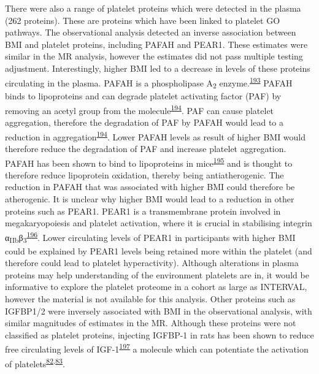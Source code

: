 \documentclass[11pt,twoside]{bristolthesis}
\begin{document}
There were also a range of platelet proteins which were detected in the plasma (262 proteins). These are proteins which have been linked to platelet GO pathways. The observational analysis detected an inverse association between BMI and platelet proteins, including PAFAH and PEAR1. These estimates were similar in the MR analysis, however the estimates did not pass multiple testing adjustment. Interestingly, higher BMI led to a decrease in levels of these proteins circulating in the plasma. PAFAH is a phospholipase A\textsubscript{2} enzyme.\textsuperscript{\protect\hyperlink{ref-Marathe2018}{193}} PAFAH binds to lipoproteins and can degrade platelet activating factor (PAF) by removing an acetyl group from the molecule\textsuperscript{\protect\hyperlink{ref-Lordan2019}{194}}. PAF can cause platelet aggregation, therefore the degradation of PAF by PAFAH would lead to a reduction in aggregation\textsuperscript{\protect\hyperlink{ref-Lordan2019}{194}}. Lower PAFAH levels as result of higher BMI would therefore reduce the degradation of PAF and increase platelet aggregation. PAFAH has been shown to bind to lipoproteins in mice\textsuperscript{\protect\hyperlink{ref-Noto2003}{195}} and is thought to therefore reduce lipoprotein oxidation, thereby being antiatherogenic. The reduction in PAFAH that was associated with higher BMI could therefore be atherogenic. It is unclear why higher BMI would lead to a reduction in other proteins such as PEAR1. PEAR1 is a transmembrane protein involved in megakaryopoiesis and platelet activation, where it is crucial in stabilising integrin α\textsubscript{IIb}β\textsubscript{3}\textsuperscript{\protect\hyperlink{ref-Kauskot2012}{196}}. Lower circulating levels of PEAR1 in participants with higher BMI could be explained by PEAR1 levels being retained more within the platelet (and therefore could lead to platelet hyperactivity). Although alterations in plasma proteins may help understanding of the environment platelets are in, it would be informative to explore the platelet proteome in a cohort as large as INTERVAL, however the material is not available for this analysis. Other proteins such as IGFBP1/2 were inversely associated with BMI in the observational analysis, with similar magnitudes of estimates in the MR. Although these proteins were not classified as platelet proteins, injecting IGFBP-1 in rats has been shown to reduce free circulating levels of IGF-1\textsuperscript{\protect\hyperlink{ref-Lang2003}{197}} a molecule which can potentiate the activation of platelets\textsuperscript{\protect\hyperlink{ref-Frystyk1995}{82},\protect\hyperlink{ref-Hers2007}{83}}.
\end{document}
